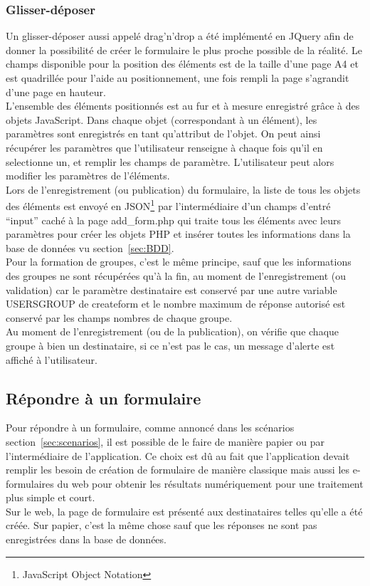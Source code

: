 \documentclass{sigplanconf}
\begin{document}
\subsubsection{Glisser-déposer}
Un glisser-déposer aussi appelé drag'n'drop a été implémenté en JQuery afin de donner la possibilité de créer le formulaire le plus proche possible de la réalité. Le champs disponible pour la position des éléments est de la taille d’une page A4 et est quadrillée pour l'aide au positionnement, une fois rempli la page s’agrandit d’une page en hauteur.\\
L'ensemble des éléments positionnés est au fur et à mesure enregistré grâce à des objets JavaScript. Dans chaque objet (correspondant à un élément), les paramètres sont enregistrés en tant qu'attribut de l'objet. On peut ainsi récupérer les paramètres que l'utilisateur renseigne à chaque fois qu'il en selectionne un, et remplir les champs de paramètre. L'utilisateur peut alors modifier les paramètres de l'éléments.\\
Lors de l'enregistrement (ou publication) du formulaire, la liste de tous les objets des éléments est envoyé en JSON\footnote{JavaScript Object Notation} par l'intermédiaire d'un champs d'entré ``input'' caché à la page add\_form.php qui traite tous les éléments avec leurs paramètres pour créer les objets PHP et insérer toutes les informations dans la base de données vu section~\ref{sec:BDD}.\\

Pour la formation de groupes, c’est le même principe, sauf que les informations des groupes ne sont récupérées qu’à la fin, au moment de l’enregistrement (ou validation) car le paramètre destinataire est conservé par une autre variable USERSGROUP de createform et le nombre maximum de réponse autorisé est conservé par les champs nombres de chaque groupe.\\
Au moment de l'enregistrement (ou de la publication), on vérifie que chaque groupe à bien un destinataire, si ce n'est pas le cas, un message d'alerte est affiché à l'utilisateur.

\subsection{Répondre à un formulaire} 
Pour répondre à un formulaire, comme annoncé dans les scénarios section~\ref{sec:scenarios}, il est possible de le faire de manière papier ou par l'intermédiaire de l'application. Ce choix est dû au fait que l'application devait remplir les besoin de création de formulaire de manière classique mais aussi les e-formulaires du web pour obtenir les résultats numériquement pour une traitement plus simple et court.\\
Sur le web, la page de formulaire est présenté aux destinataires telles qu'elle a été créée. Sur papier, c'est la même chose sauf que les réponses ne sont pas enregistrées dans la base de données.
\end{document}
